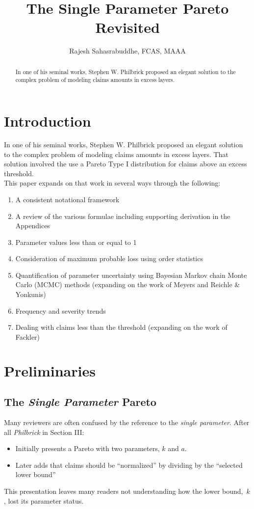 \documentclass[]{article} %
\title{The Single Parameter Pareto Revisited}
\author{Rajesh Sahasrabuddhe, FCAS, MAAA}
\begin{document}
\maketitle

\begin{abstract}
In one of his seminal works, Stephen W. Philbrick proposed an elegant solution to the complex problem of modeling claims amounts in excess layers. 

\end{abstract}

\section{Introduction}
In one of his seminal works, Stephen W. Philbrick\cite{Philbrick} proposed an elegant solution to the complex problem of modeling claims amounts in excess layers. That solution involved the use a Pareto Type I distribution for claims above an excess threshold.\\

This paper expands on that work in several ways through the following:
\begin{enumerate}
	\item A consistent notational framework
	\item A review of the various formulae including supporting derivation in the Appendices
	\item Parameter values less than or equal to 1
	\item Consideration of maximum probable loss using order statistics
	\item Quantification of parameter uncertainty using Bayesian Markov chain Monte Carlo (MCMC) methods (expanding on the work of Meyers and Reichle \& Yonkunis)
	\item Frequency and severity trends
	\item Dealing with claims less than the threshold (expanding on the work of Fackler)
\end{enumerate}
\section{Preliminaries}\label{Prelims}
\subsection{The \emph{Single Parameter} Pareto}
Many reviewers are often confused by the reference to the \emph{single parameter}. After all \emph{Philbrick} in Section III:
\begin{itemize}
\item Initially presents a Pareto with two parameters, $k$ and $a$.
\item Later adds that claims should be ``normalized'' by dividing by the ``selected lower bound''
\end{itemize}
This presentation leaves many readers not understanding how the lower bound,~$k$,  lost its parameter status. 
\end{document}

